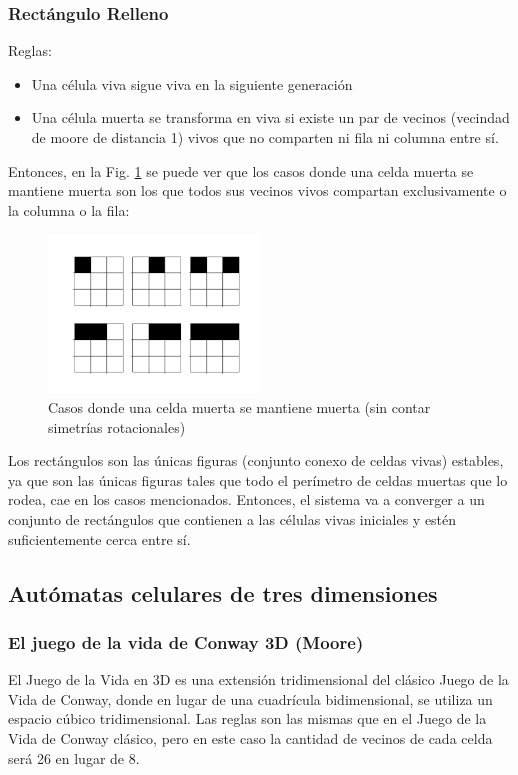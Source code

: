 \subsubsection{Rectángulo Relleno}
Reglas:
\begin{itemize}
    \item Una célula viva sigue viva en la siguiente generación
    \item Una célula muerta se transforma en viva si existe un par de vecinos (vecindad de moore de distancia 1) vivos que no comparten ni fila ni columna entre sí.
\end{itemize}
Entonces, en la Fig. \ref{fig:fill} se puede ver que los casos donde una celda muerta se mantiene muerta son los que todos sus vecinos vivos compartan exclusivamente o la columna o la fila:
\begin{figure}[H]
    \centering
    \includegraphics[width=0.5\textwidth]{Images/fill_example_1a}
    \captionsetup{justification=centering}
    \caption{Casos donde una celda muerta se mantiene muerta (sin contar simetrías rotacionales)}

    \label{fig:fill}
\end{figure}
Los rectángulos son las únicas figuras (conjunto conexo de celdas vivas) estables, ya que son las únicas figuras tales que todo el perímetro de celdas muertas que lo rodea, cae en los casos mencionados.
Entonces, el sistema va a converger a un conjunto de rectángulos que contienen a las células vivas iniciales y estén suficientemente cerca entre sí.

\subsection{Autómatas celulares de tres dimensiones}
\label{subsec:3d}

\subsubsection{El juego de la vida de Conway 3D (Moore)}
El Juego de la Vida en 3D es una extensión tridimensional del clásico Juego de la Vida de Conway, donde en lugar de una cuadrícula bidimensional, se utiliza un espacio cúbico tridimensional.
Las reglas son las mismas que en el Juego de la Vida de Conway clásico, pero en este caso la cantidad de vecinos de cada celda será 26 en lugar de 8.

